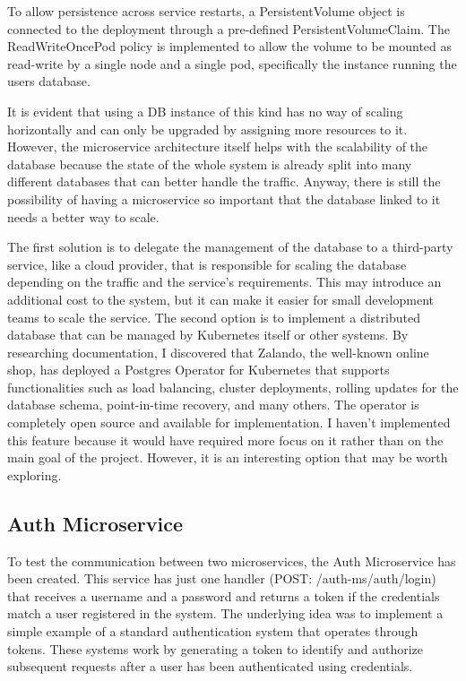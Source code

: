 \documentclass[manuscript,screen,review]{acmart}
\begin{document}
To allow persistence across service restarts, a PersistentVolume object is connected to the deployment through a pre-defined PersistentVolumeClaim. The ReadWriteOncePod policy is implemented to allow the volume to be mounted as read-write by a single node and a single pod, specifically the instance running the users database.

It is evident that using a DB instance of this kind has no way of scaling horizontally and can only be upgraded by assigning more resources to it. However, the microservice architecture itself helps with the scalability of the database because the state of the whole system is already split into many different databases that can better handle the traffic. Anyway, there is still the possibility of having a microservice so important that the database linked to it needs a better way to scale.

The first solution is to delegate the management of the database to a third-party service, like a cloud provider, that is responsible for scaling the database depending on the traffic and the service's requirements. This may introduce an additional cost to the system, but it can make it easier for small development teams to scale the service. 
The second option is to implement a distributed database that can be managed by Kubernetes itself or other systems.
By researching documentation, I discovered that Zalando, the well-known online shop, has deployed a Postgres Operator for Kubernetes that supports functionalities such as load balancing, cluster deployments, rolling updates for the database schema, point-in-time recovery, and many others. The operator is completely open source and available for implementation.
I haven't implemented this feature because it would have required more focus on it rather than on the main goal of the project. However, it is an interesting option that may be worth exploring.

\subsection{Auth Microservice}
To test the communication between two microservices, the Auth Microservice has been created. This service has just one handler (POST: /auth-ms/auth/login) that receives a username and a password and returns a token if the credentials match a user registered in the system. The underlying idea was to implement a simple example of a standard authentication system that operates through tokens. These systems work by generating a token to identify and authorize subsequent requests after a user has been authenticated using credentials.
\end{document}
